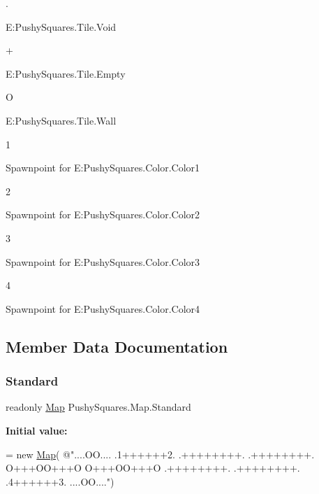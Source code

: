 \begin{DoxyCode}
.
\end{DoxyCode}
 E\+:\+Pushy\+Squares.\+Tile.\+Void   
\begin{DoxyCode}
+
\end{DoxyCode}
 E\+:\+Pushy\+Squares.\+Tile.\+Empty   
\begin{DoxyCode}
O
\end{DoxyCode}
 E\+:\+Pushy\+Squares.\+Tile.\+Wall   
\begin{DoxyCode}
1
\end{DoxyCode}
 Spawnpoint for E\+:\+Pushy\+Squares.\+Color.\+Color1   
\begin{DoxyCode}
2
\end{DoxyCode}
 Spawnpoint for E\+:\+Pushy\+Squares.\+Color.\+Color2   
\begin{DoxyCode}
3
\end{DoxyCode}
 Spawnpoint for E\+:\+Pushy\+Squares.\+Color.\+Color3   
\begin{DoxyCode}
4
\end{DoxyCode}
 Spawnpoint for E\+:\+Pushy\+Squares.\+Color.\+Color4  

\subsection{Member Data Documentation}
\mbox{\label{struct_pushy_squares_1_1_map_aae0947b0379bf76f1a7df5e7c48344fe}} 
\subsubsection{\texorpdfstring{Standard}{Standard}}
{\footnotesize\ttfamily readonly \hyperlink{struct_pushy_squares_1_1_map}{Map} Pushy\+Squares.\+Map.\+Standard\hspace{0.3cm}{\ttfamily [static]}}

{\bfseries Initial value\+:}
\begin{DoxyCode}
= \textcolor{keyword}{new} \hyperlink{struct_pushy_squares_1_1_map_aa1b0c05acd50a2f77f48f6d07de19afb}{Map}(
\textcolor{stringliteral}{@"....OO....}
\textcolor{stringliteral}{.1++++++2.}
\textcolor{stringliteral}{.++++++++.}
\textcolor{stringliteral}{.++++++++.}
\textcolor{stringliteral}{O+++OO+++O}
\textcolor{stringliteral}{O+++OO+++O}
\textcolor{stringliteral}{.++++++++.}
\textcolor{stringliteral}{.++++++++.}
\textcolor{stringliteral}{.4++++++3.}
\textcolor{stringliteral}{....OO...."})
\end{DoxyCode}


